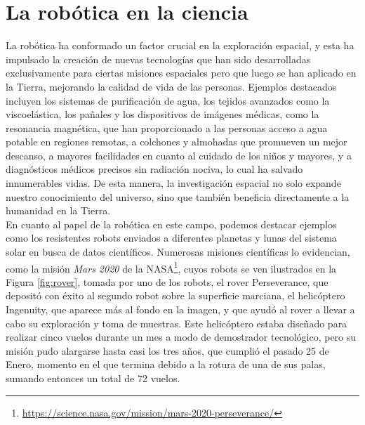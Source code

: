 \section{La robótica en la ciencia}
\label{sec:exploracion_espacial} %

La robótica ha conformado un factor crucial en la exploración espacial, y esta
ha impulsado la creación de nuevas tecnologías que han sido desarrolladas
exclusivamente para ciertas misiones espaciales pero que luego se han aplicado
en la Tierra, mejorando la calidad de vida de las personas.
Ejemplos destacados incluyen los sistemas de purificación de agua, los tejidos
avanzados como la viscoelástica, los pañales y los dispositivos de imágenes
médicas, como la resonancia magnética, que han proporcionado a las personas
acceso a agua potable en regiones remotas, a colchones y almohadas que promueven
un mejor descanso, a mayores facilidades en cuanto al cuidado de los niños y
mayores, y a diagnósticos médicos precisos sin radiación nociva, lo cual ha
salvado innumerables vidas.
De esta manera, la investigación espacial no solo expande nuestro conocimiento
del universo, sino que también beneficia directamente a la humanidad en la
Tierra.
\\

En cuanto al papel de la robótica en este campo, podemos destacar ejemplos como
los resistentes robots enviados a diferentes planetas y lunas del sistema solar
en busca de datos científicos.
Numerosas misiones científicas lo evidencian, como la misión \textit{Mars 2020}
de la NASA\footnote{
\href{https://science.nasa.gov/mission/mars-2020-perseverance/}{https://science.nasa.gov/mission/mars-2020-perseverance/}},
cuyos robots se ven ilustrados en la Figura \ref{fig:rover}, tomada por uno de
los robots, el rover Perseverance, que depositó con éxito al segundo robot sobre
la superficie marciana, el helicóptero Ingenuity, que aparece más al fondo en la
imagen, y que ayudó al rover a llevar a cabo su exploración y toma de muestras.
Este helicóptero estaba diseñado para realizar cinco vuelos durante un mes a
modo de demostrador tecnológico, pero su misión pudo alargarse hasta casi los
tres años, que cumplió el pasado 25 de Enero, momento en el que termina debido a
la rotura de una de sus palas, sumando entonces un total de 72 vuelos.

